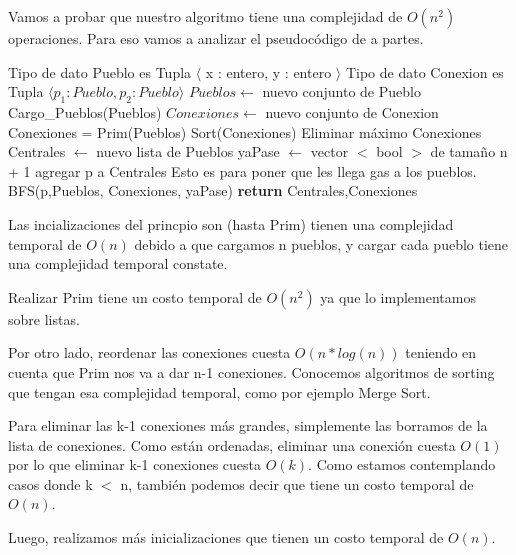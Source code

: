 Vamos a probar que nuestro algoritmo tiene una complejidad de $O(n^2)$ operaciones. Para eso vamos a analizar el pseudocódigo de a partes.

\begin{center}
\begin{pseudo}
\State Tipo de dato Pueblo es Tupla $\langle$ x : entero, y : entero $\rangle$
\State Tipo de dato Conexion es Tupla $\langle p_1 : Pueblo, p_2 : Pueblo \rangle$
        \State $Pueblos \leftarrow$ nuevo conjunto de Pueblo 
        \State Cargo\_Pueblos(Pueblos) 
        \State $Conexiones \leftarrow$ nuevo conjunto de Conexion 
        \State Conexiones = Prim(Pueblos) 
        \State Sort(Conexiones) 
         
	  \State Eliminar máximo Conexiones 
	\EndFor
        \State Centrales $\leftarrow$ nuevo lista de Pueblos 
        \State yaPase $\leftarrow$ vector $<$ bool $>$ de tamaño n + 1 
         
         
        \State agregar p a Centrales 
        \Comment Esto es para poner que les llega gas a los pueblos.
        \State BFS(p,Pueblos, Conexiones, yaPase) 
        \EndIf
        \EndFor
        \State \textbf{return} Centrales,Conexiones 
    \EndProcedure
\end{pseudo}
\end{center}

Las incializaciones del princpio son (hasta Prim) tienen una complejidad temporal de $O(n)$ debido a que cargamos n pueblos, y cargar cada pueblo tiene una complejidad temporal constate.

Realizar Prim tiene un costo temporal de $O(n^2)$ ya que lo implementamos sobre listas.

Por otro lado, reordenar las conexiones cuesta $O(n*log(n))$ teniendo en cuenta que Prim nos va a dar n-1 conexiones. Conocemos algoritmos de sorting que tengan esa complejidad temporal, como por ejemplo Merge Sort.

Para eliminar las k-1 conexiones más grandes, simplemente las borramos de la lista de conexiones. Como están ordenadas, eliminar una conexión cuesta $O(1)$ por lo que eliminar k-1 conexiones cuesta $O(k)$. Como estamos contemplando casos donde k  $<$ n, también podemos decir que tiene un costo temporal de $O(n)$.

Luego, realizamos más inicializaciones que tienen un costo temporal de $O(n)$.

